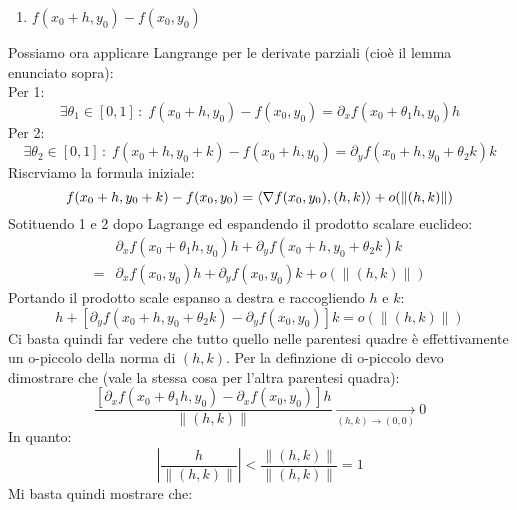 {\begin{enumerate}
		\item $f(x_0 + h, y_0) - f(x_0, y_0)$
	\end{enumerate}
	Possiamo ora applicare Langrange per le derivate parziali (cioè il 
	lemma enunciato sopra):\\
	Per 1:
	\begin{equation*}
		\exists \theta_1 \in [0, 1] \, : \; f(x_0 + h, y_0) - 
		f(x_0, y_0) = \partial_x f(x_0 + \theta_1 h, y_0)h
	\end{equation*}
	Per 2:
	\begin{equation*}
		\exists \theta_2 \in [0, 1] \, : \; f(x_0 + h, y_0 + k) - 
		f(x_0 + h, y_0) = \partial_y f(x_0 + h, y_0 + \theta_2 k)k
	\end{equation*}
	Riscrviamo la formula iniziale:
	\begin{equation*}
		f(x_0 + h, y_0 + k) - f(x_0, y_0) = \langle \nabla f(x_0, y_0), 
		(h, k) \rangle + o(\lVert (h, k) \rVert)\\
	\end{equation*}
	Sotituendo 1 e 2 dopo Lagrange ed espandendo il prodotto scalare euclideo:
	\begin{align*}
		&\partial_x f(x_0 + \theta_1 h, y_0) h + \partial_y f(x_0 + h, y_0 + 
		\theta_2 k) k \\[2pt]
		=& \partial_x f(x_0, y_0) h + \partial_y f(x_0, y_0) k + 
		o(\lVert (h, k) \rVert)
	\end{align*}
    Portando il prodotto scale espanso a destra e raccogliendo $h$ e $k$:
	\begin{equation*}
		[\partial_x f(x_0 + \theta_1 h, y_0) - \partial_x f(x_0, y_0) ]h 
		+ [\partial_y f(x_0 + h, y_0 + \theta_2 k) - \partial_y f(x_0, 
		y_0)]k = o(\lVert (h, k) \rVert)
	\end{equation*}
	Ci basta quindi far vedere che tutto quello nelle parentesi quadre è 
	effettivamente un o-piccolo della norma di $(h, k)$. Per la definzione 
	di o-piccolo devo dimostrare che (vale la stessa cosa per l'altra 
	parentesi quadra):
	\begin{equation*}
		\dfrac{[\partial_x f(x_0 + \theta_1 h, y_0) - \partial_x 
		f(x_0, y_0) ]h}{\lVert (h, k) \rVert} \xrightarrow[(h, k) \to 
		(0, 0)] {} 0
	\end{equation*}
	In quanto:
	\begin{equation*}
		\left | \dfrac{h}{\lVert (h, k) \rVert} \right | < \dfrac{\lVert 
		(h, k) \rVert}{\lVert (h, k) \rVert} = 1
	\end{equation*}
	Mi basta quindi mostrare che:
	\begin{equation*}

\end{equation*}}
